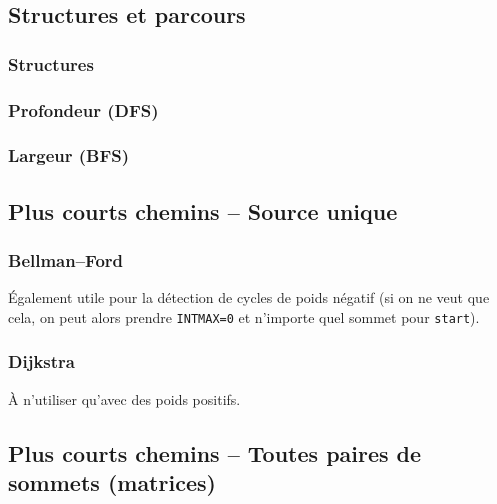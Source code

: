 \documentclass{article}
\begin{document}
\subsection{Structures et parcours}
\subsubsection{Structures}

\parbox{0.5\textwidth}{}
\parbox{0.5\textwidth}{}

\subsubsection{Profondeur (DFS)}

\parbox{0.5\textwidth}{}
\parbox{0.5\textwidth}{}


\subsubsection{Largeur (BFS)}

\parbox{0.5\textwidth}{}
\parbox{0.5\textwidth}{}


\subsection{Plus courts chemins -- Source unique}

\subsubsection{Bellman--Ford}

\'Egalement utile pour la détection de cycles de poids négatif (si on ne veut que cela, on peut alors prendre \texttt{INTMAX=0} et n'importe quel sommet pour \texttt{start}).



\subsubsection{Dijkstra}

\`A n'utiliser qu'avec des poids positifs.



\subsection{Plus courts chemins -- Toutes paires de sommets (matrices)}
\end{document}
